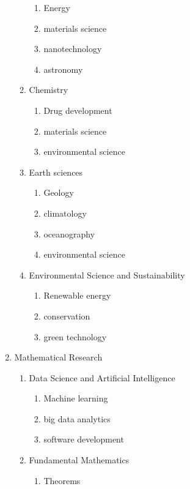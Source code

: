 \begin{enumerate}
\begin{enumerate}
        \begin{enumerate}
            \item Energy
            \item materials science
            \item nanotechnology
            \item astronomy
        \end{enumerate}
        \item Chemistry 
        \begin{enumerate}
            \item Drug development
            \item materials science
            \item environmental science
        \end{enumerate}
        \item Earth sciences 
        \begin{enumerate}
            \item Geology
            \item climatology
            \item oceanography
            \item environmental science
        \end{enumerate}
        \item Environmental Science and Sustainability 
        \begin{enumerate}
            \item Renewable energy
            \item conservation
            \item green technology
        \end{enumerate}
    \end{enumerate}
    \item Mathematical Research
    \begin{enumerate}
        \item Data Science and Artificial Intelligence 
        \begin{enumerate}
            \item Machine learning
            \item big data analytics
            \item software development
        \end{enumerate}
        \item Fundamental Mathematics
        \begin{enumerate}
            \item Theorems

\end{enumerate}
\end{enumerate}
\end{enumerate}

